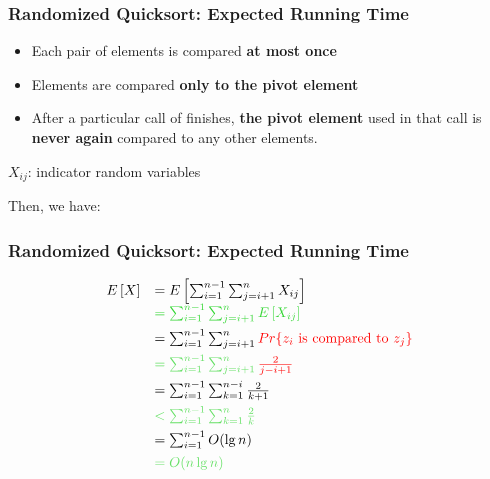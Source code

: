 \documentclass[UTF8,11pt,handout]{beamer}
\begin{document}
\begin{frame}[t]
\frametitle{Randomized Quicksort: Expected Running Time}
	\begin{itemize}
		\item  Each pair of elements is compared \textbf{\color{blue}at most once}
		\item  Elements are compared \textbf{\color{blue}only to the pivot element}
		\item  After a particular call of  finishes, \textbf{\color{blue}the pivot element} used in that call is \textbf{\color{blue}never again} compared to any other elements. 
	\end{itemize}
\pause\begin{block}{$X_{ij}$: indicator random variables}
	\begin{center}
	\end{center}
\end{block}
\pause\begin{block}{Then, we have:}
	\begin{center}
	\end{center}
\end{block}
\end{frame}

\begin{frame}[t]
\frametitle{Randomized Quicksort: Expected Running Time}
	\begin{center}
	\[	
		\begin{array}{ll}
			E\left[X\right]&=E\left[\sum_{i=1}^{n-1}{\sum_{j=i+1}^{n}{X_{ij}}}\right]\\\vspace{1ex} 
			&{\color{green!80!black!80!}=\sum_{i=1}^{n-1}{\sum_{j=i+1}^{n}{E\left[X_{ij}\right]}}}\\\vspace{1ex} 
			&=\sum_{i=1}^{n-1}{\sum_{j=i+1}^{n}{\color{red}Pr\{z_i \text{ is compared to } z_j\}}}\\\vspace{1ex} 
			&{\color{green!80!black!60!}=\sum_{i=1}^{n-1}{\sum_{j=i+1}^{n}{\color{red}\frac{2}{j-i+1}}}}\\\vspace{1ex} 
			&=\sum_{i=1}^{n-1}{\sum_{k=1}^{n-i}{\frac{2}{k+1}}}\\\vspace{1ex} 
			&{\color{green!80!black!60!}<\sum_{i=1}^{n-1}{\sum_{k=1}^{n}{\frac{2}{k}}}}\\\vspace{1ex} 
			&=\sum_{i=1}^{n-1}{{O(\lg{n})}}\\\vspace{1ex} 
			&{\color{green!80!black!60!}=O(n\lg{n})}\\\vspace{1ex} 
		\end{array}
	\]
	\end{center}
\end{frame}
\end{document}
